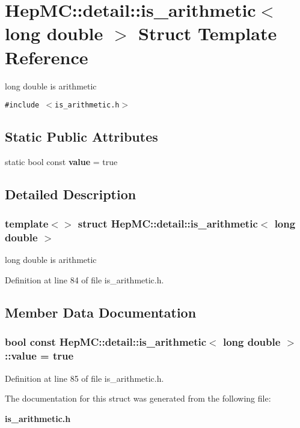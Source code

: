 \section{Hep\-MC::detail::is\_\-arithmetic$<$ long double $>$ Struct Template Reference}
\label{structHepMC_1_1detail_1_1is__arithmetic_3_01long_01double_01_4}
long double is arithmetic  


{\tt \#include $<$is\_\-arithmetic.h$>$}

\subsection*{Static Public Attributes}
\begin{CompactItemize}
\item 
static bool const {\bf value} = true
\end{CompactItemize}


\subsection{Detailed Description}
\subsubsection*{template$<$$>$ struct Hep\-MC::detail::is\_\-arithmetic$<$ long double $>$}

long double is arithmetic 



Definition at line 84 of file is\_\-arithmetic.h.

\subsection{Member Data Documentation}
\subsubsection{\setlength{\rightskip}{0pt plus 5cm}bool const {\bf Hep\-MC::detail::is\_\-arithmetic}$<$ long double $>$::{\bf value} = true\hspace{0.3cm}{\tt  [static]}}\label{structHepMC_1_1detail_1_1is__arithmetic_3_01long_01double_01_4_1f2633b86bf19138dba60a5090860b71}




Definition at line 85 of file is\_\-arithmetic.h.

The documentation for this struct was generated from the following file:\begin{CompactItemize}
\item 
{\bf is\_\-arithmetic.h}\end{CompactItemize}
